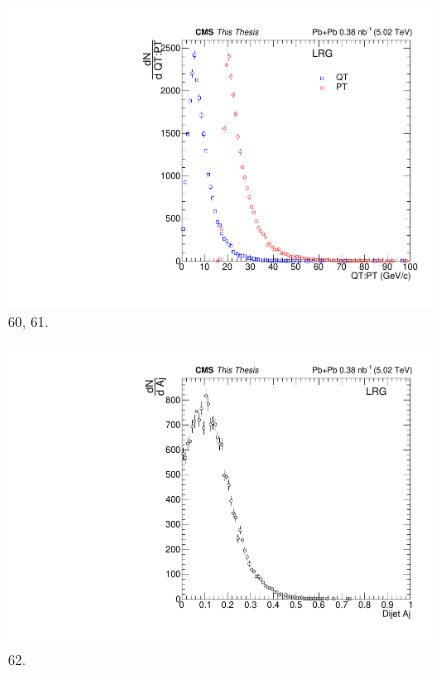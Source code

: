 \begin{figure}[h!]
\begin{centering}
\includegraphics[width=5in]{Chapter6/importfigs/60_61_thesis.pdf}
\par\end{centering}
\caption{60, 61. \label{fig:60_61}}
\end{figure}

\begin{figure}[h!]
\begin{centering}
\includegraphics[width=5in]{Chapter6/importfigs/62_thesis.pdf}
\par\end{centering}
\caption{62. \label{fig:62}}
\end{figure}

